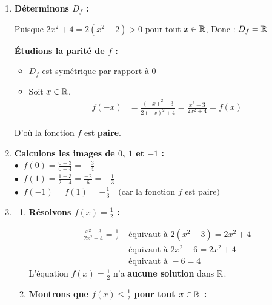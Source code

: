 \documentclass[10pt, a4paper]{article}
\begin{document}
\begin{Solution}[APPLICATION][16]
\begin{enumerate}[leftmargin=*,itemsep=0.5pt]
    \item \textbf{Déterminons $D_f$ :}

    Puisque $2x^2 + 4 = 2(x^2 + 2) > 0$ pour tout $x \in \mathbb{R}$, 
    Donc : \quad $D_f = \mathbb{R}$

    \textbf{Étudions la parité de $f$ :}
    \begin{itemize}[leftmargin=*,itemsep=1pt]
        \item $D_f$ est symétrique par rapport à $0$

        \item Soit $x \in \mathbb{R}$.
    \begin{align*}
        f(-x) &= \frac{(-x)^2 - 3}{2(-x)^2 + 4} = \frac{x^2 - 3}{2x^2 + 4} = f(x)
    \end{align*}
    \end{itemize}
    D'où la fonction $f$ est \textbf{paire}.

    \item \textbf{Calculons les images de $0$, $1$ et $-1$ :} \\[5pt]
       $\bullet~$ $f(0) = \frac{0 - 3}{0 + 4} = -\frac{3}{4}$ \\[5pt]
       $\bullet~$ $f(1) = \frac{1 - 3}{2 + 4} = \frac{-2}{6} = -\frac{1}{3}$ \\[5pt]
       $\bullet~$ $f(-1) = f(1) = -\frac{1}{3} \quad \text{(car la fonction $f$ est paire)}$

    \item
    \begin{enumerate}[leftmargin=*,itemsep=0.5pt]
        \item \textbf{Résolvons $f(x) = \frac{1}{2}$ :}

        \begin{align*}
            \frac{x^2 - 3}{2x^2 + 4} = \frac{1}{2}
            &\text{ équivaut à } 2(x^2 - 3) = 2x^2 + 4 \\
            &\text{ équivaut à } 2x^2 - 6 = 2x^2 + 4 \\
            &\text{ équivaut à } -6 = 4
        \end{align*}
        L'équation $f(x) = \frac{1}{2}$ n'a \textbf{aucune solution} dans $\mathbb{R}$.

        \item \textbf{Montrons que $f(x) \leq \frac{1}{2}$ pour tout $x \in \mathbb{R}$ :}


\end{enumerate}
\end{enumerate}
\end{Solution}
\end{document}

